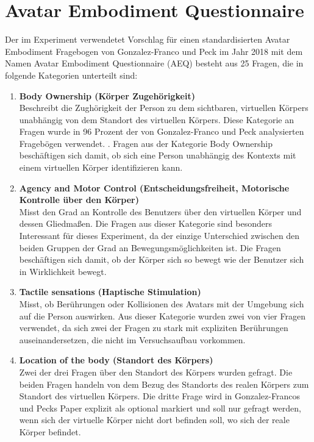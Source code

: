 \section{Avatar Embodiment Questionnaire}
Der im Experiment verwendetet Vorschlag für einen standardisierten Avatar Embodiment Fragebogen von Gonzalez-Franco und Peck im Jahr 2018 \cite{Gonzalez-Franco2018} mit dem Namen Avatar Embodiment Questionnaire (AEQ) besteht aus 25 Fragen, die in folgende Kategorien unterteilt sind:
\begin{enumerate} 

\item \textbf{Body Ownership (Körper Zugehörigkeit)}\\
Beschreibt die Zughörigkeit der Person zu dem sichtbaren, virtuellen Körpers unabhängig von dem Standort des virtuellen Körpers. Diese Kategorie an Fragen wurde in 96 Prozent der von Gonzalez-Franco und Peck analysierten Fragebögen verwendet. \cite{Gonzalez-Franco2018}. Fragen aus der Kategorie Body Ownership beschäftigen sich damit, ob sich eine Person unabhängig des Kontexts mit einem virtuellen Körper identifizieren kann.

\item\textbf{Agency and Motor Control (Entscheidungsfreiheit, Motorische Kontrolle über den Körper)}\\
Misst den Grad an Kontrolle des Benutzers über den virtuellen Körper und dessen Gliedmaßen. Die Fragen aus dieser Kategorie sind besonders Interessant für dieses Experiment, da der einzige Unterschied zwischen den beiden Gruppen der Grad an Bewegungsmöglichkeiten ist. Die Fragen beschäftigen sich damit, ob der Körper sich so bewegt wie der Benutzer sich in Wirklichkeit bewegt.

\item\textbf{Tactile sensations (Haptische Stimulation)}\\
Misst, ob Berührungen oder Kollisionen des Avatars mit der Umgebung sich auf die Person auswirken. Aus dieser Kategorie wurden zwei von vier Fragen verwendet, da sich zwei der Fragen zu stark mit expliziten Berührungen auseinandersetzen, die nicht im Versuchsaufbau vorkommen.

\item\textbf{Location of the body (Standort des Körpers)}\\
Zwei der drei Fragen über den Standort des Körpers wurden gefragt. Die beiden Fragen handeln von dem Bezug des Standorts des realen Körpers zum Standort des virtuellen Körpers. Die dritte Frage wird in Gonzalez-Francos und Pecks Paper explizit als optional markiert und soll nur gefragt werden, wenn sich der virtuelle Körper nicht dort befinden soll, wo sich der reale Körper befindet.


\end{enumerate}
